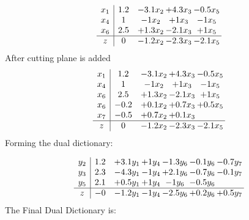 \documentclass[11pt]{article}
\begin{document}
\[\begin{array}{c| c c@{\hskip 2pt} c@{\hskip 2pt} c@{\hskip 2pt} }
 x_{1}   &  1.2 & -3.1 x_{2} & + 4.3 x_{3} & -0.5 x_{5}\\
 x_{4}   &  1 & -1 x_{2} & + 1 x_{3} & -1 x_{5}\\
 x_{6}   &  2.5 & + 1.3 x_{2} & -2.1 x_{3} & + 1 x_{5}\\
\hline
z    &  0 & -1.2 x_{2} & -2.3 x_{3} & -2.1 x_{5}\\
\end{array}\]
 After cutting plane is added 
\[\begin{array}{c| c c@{\hskip 2pt} c@{\hskip 2pt} c@{\hskip 2pt} }
 x_{1}   &  1.2 & -3.1 x_{2} & + 4.3 x_{3} & -0.5 x_{5}\\
 x_{4}   &  1 & -1 x_{2} & + 1 x_{3} & -1 x_{5}\\
 x_{6}   &  2.5 & + 1.3 x_{2} & -2.1 x_{3} & + 1 x_{5}\\
 x_{6}   &  -0.2 & + 0.1 x_{2} & + 0.7 x_{3} & + 0.5 x_{5}\\
 x_{7}   &  -0.5 & + 0.7 x_{2} & + 0.1 x_{3} &   \\
\hline
z    &  0 & -1.2 x_{2} & -2.3 x_{3} & -2.1 x_{5}\\
\end{array}\]
Forming the dual dictionary:

\[\begin{array}{c| c c@{\hskip 2pt} c@{\hskip 2pt} c@{\hskip 2pt} c@{\hskip 2pt} c@{\hskip 2pt} }
 y_{2}   &  1.2 & + 3.1 y_{1} & + 1 y_{4} & -1.3 y_{6} & -0.1 y_{6} & -0.7 y_{7}\\
 y_{3}   &  2.3 & -4.3 y_{1} & -1 y_{4} & + 2.1 y_{6} & -0.7 y_{6} & -0.1 y_{7}\\
 y_{5}   &  2.1 & + 0.5 y_{1} & + 1 y_{4} & -1 y_{6} & -0.5 y_{6} &   \\
\hline
z    &  -0 & -1.2 y_{1} & -1 y_{4} & -2.5 y_{6} & + 0.2 y_{6} & + 0.5 y_{7}\\
\end{array}\]
The Final Dual Dictionary is: 
\end{document}
